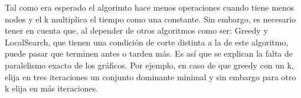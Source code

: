 Tal como era esperado el algorimto hace menos operaciones cuando tiene menos nodos y el k multiplica el tiempo como una constante.
Sin embargo, es necesario tener en cuenta que, al depender de otros algoritmos como ser: Greedy y LocalSearch, que tienen una condición de corte distinta a la de este algoritmo, puede pasar que terminen antes o tarden más.
Es así que se explican la falta de paralelismo exacto de los gráficos. Por ejemplo, en caso de que greedy con un k, elija en tres iteraciones un conjunto dominante minimal y sin embargo para otro k elija en más iteraciones.
